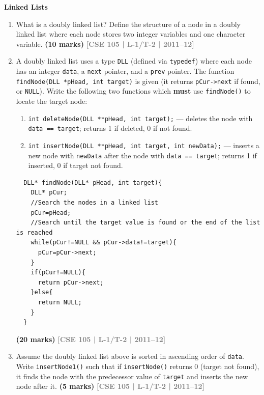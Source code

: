 \documentclass[12pt,a3paper]{article}
\newcommand{\yr}[1]{\hfill\textcolor{gray}{\small\textbf{[#1]}}}
\newcommand{\mk}[1]{\textcolor{orange!70!black}{\small\textbf{(#1 marks)}}}
\newcommand{\subtopic}[2]{%
  \vspace{10pt}
  \noindent\begin{tcolorbox}[colback=#1!8,colframe=#1,boxrule=0.6pt,arc=4pt,
    left=6pt,right=6pt,top=4pt,bottom=4pt]
    \small\bfseries\textcolor{#1}{#2}
  \end{tcolorbox}
  \vspace{2pt}
}
\begin{document}
\subtopic{cE}{Linked Lists}
\label{sub:s10-linkedlist}

\begin{enumerate}

\item What is a doubly linked list? Define the structure of a node in a doubly linked list where each node stores two integer variables and one character variable.
\mk{10} \yr{CSE 105 | L-1/T-2 | 2011--12}

\item A doubly linked list uses a type \texttt{DLL} (defined via \texttt{typedef}) where each node has an integer \texttt{data}, a \texttt{next} pointer, and a \texttt{prev} pointer. The function \texttt{findNode(DLL *pHead, int target)} is given (it returns \texttt{pCur->next} if found, or \texttt{NULL}). Write the following two functions which \textbf{must} use \texttt{findNode()} to locate the target node:
\begin{enumerate}
  \item \texttt{int deleteNode(DLL **pHead, int target);} --- deletes the node with \texttt{data == target}; returns 1 if deleted, 0 if not found.
  \item \texttt{int insertNode(DLL **pHead, int target, int newData);} --- inserts a new node with \texttt{newData} after the node with \texttt{data == target}; returns 1 if inserted, 0 if target not found.
\end{enumerate}
\begin{lstlisting}
  DLL* findNode(DLL* pHead, int target){
    DLL* pCur;
    //Search the nodes in a linked list
    pCur=pHead;
    //Search until the target value is found or the end of the list is reached
    while(pCur!=NULL && pCur->data!=target){
      pCur=pCur->next;
    }
    if(pCur!=NULL){
      return pCur->next;
    }else{
      return NULL;
    }
  }
\end{lstlisting}
\mk{20} \yr{CSE 105 | L-1/T-2 | 2011--12}

\item Assume the doubly linked list above is sorted in ascending order of \texttt{data}. Write \texttt{insertNode1()} such that if \texttt{insertNode()} returns 0 (target not found), it finds the node with the predecessor value of \texttt{target} and inserts the new node after it.
\mk{5} \yr{CSE 105 | L-1/T-2 | 2011--12}


\end{enumerate}
\end{document}

